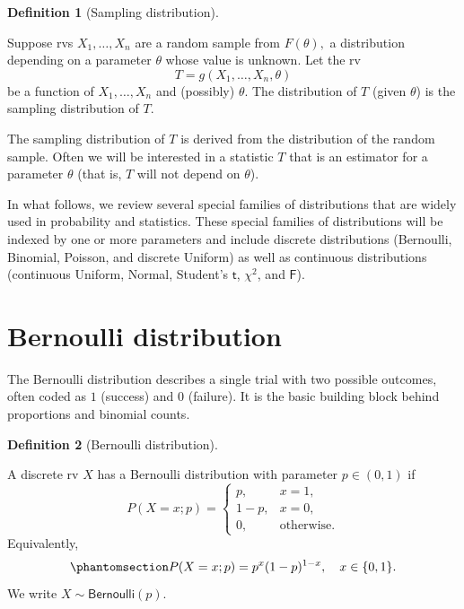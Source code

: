 \documentclass[
  a4paper,
  DIV=11,
  numbers=noendperiod,
  oneside]{scrreprt}
\theoremstyle{plain}
\theoremstyle{definition}
\theoremstyle{definition}
\newtheorem{definition}{Definition}[chapter]
\theoremstyle{definition}
\theoremstyle{plain}
\theoremstyle{remark}
\begin{document}
\begin{definition}[Sampling
distribution]\protect\hypertarget{def-sampling-dist}{}\label{def-sampling-dist}

Suppose rvs \(X_1, \dots, X_n\) are a random sample from \(F(\theta),\)
a distribution depending on a parameter \(\theta\) whose value is
unknown. Let the rv \[T = g(X_1, \dots, X_n, \theta)\] be a function of
\(X_1, \dots, X_n\) and (possibly) \(\theta\). The distribution of \(T\)
(given \(\theta\)) is the sampling distribution of \(T\).

\end{definition}

The sampling distribution of \(T\) is derived from the distribution of
the random sample. Often we will be interested in a statistic \(T\) that
is an estimator for a parameter \(\theta\) (that is, \(T\) will not
depend on \(\theta\)).

In what follows, we review several special families of distributions
that are widely used in probability and statistics. These special
families of distributions will be indexed by one or more parameters and
include discrete distributions (Bernoulli, Binomial, Poisson, and
discrete Uniform) as well as continuous distributions (continuous
Uniform, Normal, Student's \(\mathsf{t}\), \(\chi^2\), and
\(\mathsf{F}\)).

\section{Bernoulli distribution}\label{sec-bernoulli-distribution}

The Bernoulli distribution describes a single trial with two possible
outcomes, often coded as \(1\) (success) and \(0\) (failure). It is the
basic building block behind proportions and binomial counts.

\begin{definition}[Bernoulli
distribution]\protect\hypertarget{def-bernoulli-dist}{}\label{def-bernoulli-dist}

A discrete rv \(X\) has a Bernoulli distribution with parameter
\(p \in (0,1)\) if \[
P(X=x; p) =
\begin{cases}
 p, & x=1,\\
 1-p, & x=0,\\
 0, & \text{otherwise}.
\end{cases}
\] Equivalently,
\begin{equation}\phantomsection\label{eq-bernoulli-pmf}{
P(X=x; p) = p^x(1-p)^{1-x}, \quad x\in\{0,1\}.
}\end{equation} We write \(X \sim \mathsf{Bernoulli}(p)\).

\end{definition}
\end{document}
